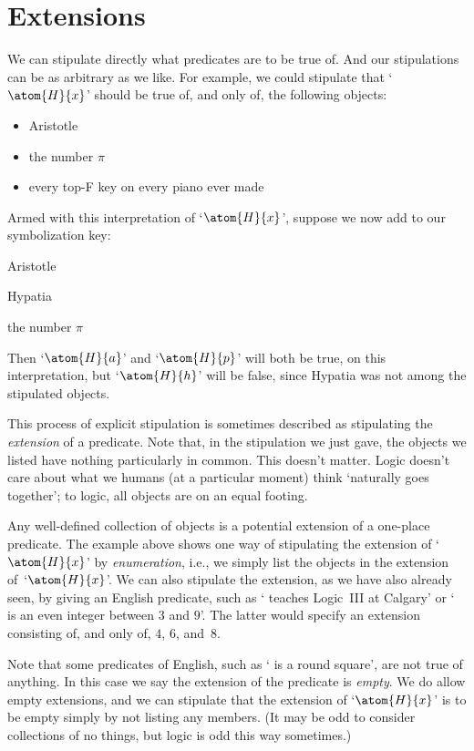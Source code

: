 \section{Extensions}\label{sec:extensions}
We can stipulate directly what predicates are to be true of. And our stipulations can be as arbitrary as we like. For example, we could stipulate that `$\atom{H}{x}$' should be true of, and only of, the following objects:
	\begin{itemize}
		\item Aristotle
		\item the number $\pi$
		\item every top-F key on every piano ever made
	\end{itemize}
Armed with this interpretation of `$\atom{H}{x}$', suppose we now add to our symbolization key:
	\begin{ekey}
		\item[a] Aristotle
		\item[h] Hypatia
		\item[p] the number $\pi$
	\end{ekey}
Then `$\atom{H}{a}$' and `$\atom{H}{p}$' will both be true, on this interpretation, but `$\atom{H}{h}$' will be false, since Hypatia was not among the stipulated objects.

This process of explicit stipulation is sometimes described as stipulating the \emph{extension} of a predicate. Note that, in the stipulation we just gave, the objects we listed have nothing particularly in common. This doesn't matter. Logic doesn't care about what we humans (at a particular moment) think `naturally goes together'; to logic, all objects are on an equal footing.

Any well-defined collection of objects is a potential extension of a one-place predicate.  The example above shows one way of stipulating the extension of `$\atom{H}{x}$' by \emph{enumeration}, i.e., we simply list the objects in the extension of~`$\atom{H}{x}$'. We can also stipulate the extension, as we have also already seen, by giving an English predicate, such as ` teaches Logic~III at Calgary' or ` is an even integer between $3$ and $9$'. The latter would specify an extension consisting of, and only of, $4$, $6$, and~$8$.

Note that some predicates of English, such as ` is a round square', are not true of anything.  In this case we say the extension of the predicate is \emph{empty}.  We do allow empty extensions, and we can stipulate that the extension of `$\atom{H}{x}$' is to be empty simply by not listing any members. (It may be odd to consider collections of no things, but logic is odd this way sometimes.)


